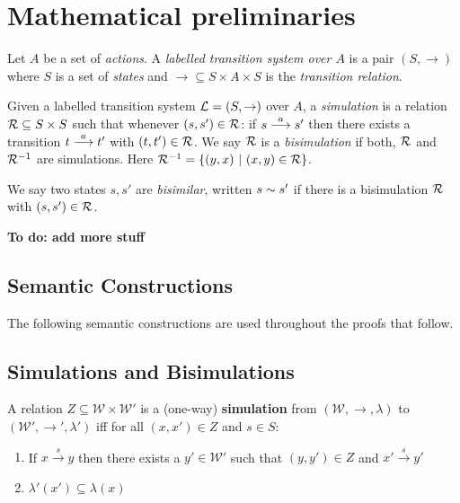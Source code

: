 \section{Mathematical preliminaries}\label{preliminaries}

\begin{definition}
Let $A$ be a set of \emph{actions}.  A \emph{labelled transition
  system over $A$} is a pair $(S, \rightarrow)$ where $S$ is a set of
\emph{states} and $\rightarrow \subseteq S \times A \times S$ is the
\emph{transition relation}.
\end{definition}

\begin{definition}
Given a labelled transition system $\mathcal{L} = (S, \rightarrow)$ over $A$,
a \emph{simulation} is a relation $\mathcal{R} \subseteq S \times S$ such
that whenever $(s, s') \in \mathcal{R}$: if $s \stackrel{a}{\longrightarrow} s'$ then there
exists a transition $t \stackrel{a}{\longrightarrow} t'$ with $(t, t') \in \mathcal{R}$.  We say
$\mathcal{R}$ is a \emph{bisimulation} if both, $\mathcal{R}$ and $\mathcal{R}^{-1}$ are
simulations. Here $\mathcal{R}^{-1} = \{(y, x)\ |\ (x, y) \in \mathcal{R}\}$.

We say two states $s, s'$ are \emph{bisimilar}, written $s \sim s'$
if there is a bisimulation $\mathcal{R}$ with $(s, s') \in \mathcal{R}$.
\end{definition}


\NI \textbf{To do: add more stuff}

\subsection{Semantic Constructions}
The following semantic constructions are used throughout the proofs that follow.
\subsection{Simulations and Bisimulations}

\NI A relation $Z \subseteq \mathcal{W} \times \mathcal{W}'$ is a
(one-way) {\bf simulation} from $(\mathcal{W}, \rightarrow, \lambda)$
to $(\mathcal{W}', \rightarrow', \lambda')$ iff for all $(x,x') \in Z$
and $s \in S$:

\begin{enumerate}

\item If $x \xrightarrow{s} y$ then there exists a $y' \in
  \mathcal{W}'$ such that $(y,y') \in Z$ and $x' \xrightarrow{s} y'$

\item $\lambda'(x') \subseteq \lambda(x)$

\end{enumerate}

